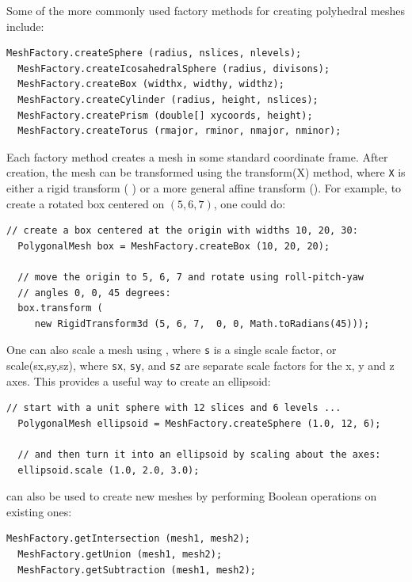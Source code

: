 Some of the more commonly used factory methods for creating polyhedral
meshes include:
\begin{lstlisting}[]
  MeshFactory.createSphere (radius, nslices, nlevels);
  MeshFactory.createIcosahedralSphere (radius, divisons);
  MeshFactory.createBox (widthx, widthy, widthz);
  MeshFactory.createCylinder (radius, height, nslices);
  MeshFactory.createPrism (double[] xycoords, height);
  MeshFactory.createTorus (rmajor, rminor, nmajor, nminor);
\end{lstlisting}
%
Each factory method creates a mesh in some standard coordinate
frame. After creation, the mesh can be transformed using the
%
{transform(X)} method, where {\tt X} is either a rigid transform (
) or a more general affine
transform ().
For example, to create a rotated box centered on $(5, 6, 7)$,
one could do:
%
\begin{lstlisting}[]
  // create a box centered at the origin with widths 10, 20, 30:
  PolygonalMesh box = MeshFactory.createBox (10, 20, 20);

  // move the origin to 5, 6, 7 and rotate using roll-pitch-yaw
  // angles 0, 0, 45 degrees:
  box.transform (
     new RigidTransform3d (5, 6, 7,  0, 0, Math.toRadians(45)));
\end{lstlisting}
%
One can also scale a mesh using
,
where {\tt s} is a single scale factor, or
%
{scale(sx,sy,sz)}, where {\tt sx}, {\tt sy}, and {\tt sz} are separate
scale factors for the x, y and z axes. This provides a useful way to
create an ellipsoid:
%
\begin{lstlisting}[]
   // start with a unit sphere with 12 slices and 6 levels ...
  PolygonalMesh ellipsoid = MeshFactory.createSphere (1.0, 12, 6);

  // and then turn it into an ellipsoid by scaling about the axes:
  ellipsoid.scale (1.0, 2.0, 3.0);
\end{lstlisting}
%
 can also be used to create
new meshes by performing Boolean operations on existing ones:
%
\begin{lstlisting}[]
  MeshFactory.getIntersection (mesh1, mesh2);
  MeshFactory.getUnion (mesh1, mesh2);
  MeshFactory.getSubtraction (mesh1, mesh2);
\end{lstlisting}
%

